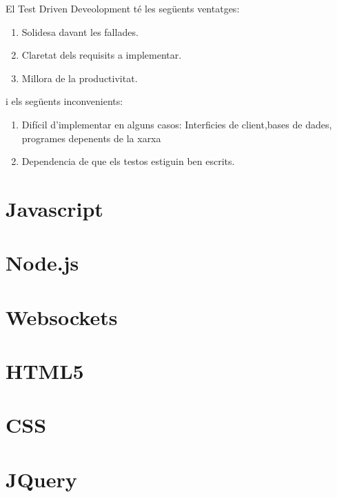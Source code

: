 El Test Driven Deveolopment té les següents ventatges: 

\begin{enumerate}
    \item{Solidesa davant les fallades.}
    \item{Claretat dels requisits a implementar.}
    \item{Millora de la productivitat.}
\end{enumerate}

i els següents inconvenients: 

\begin{enumerate}
    \item{Difícil d'implementar en alguns casos: Interficies de client,bases de dades, programes depenents de la xarxa }
    \item{Dependencia de que els testos estiguin ben escrits. }
    
\end{enumerate}



\section{Javascript}

\section{Node.js}

\section{Websockets}

\section{HTML5}

\section{CSS}

\section{JQuery}

